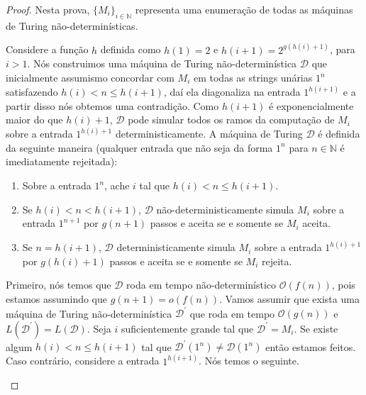 \begin{proof}

Nesta prova, $\{M_{i}\}_{i \in \mathbb{N}}$ representa uma enumeração de todas as máquinas de Turing não-determinísticas.

Considere a função $h$ definida como $h(1) = 2$ e $h(i + 1) = 2^{g(h(i) + 1)}$, para $i > 1$. Nós construimos uma máquina de Turing não-determinística $\mathcal{D}$ que inicialmente assumismo concordar com $M_{i}$ em todas as strings unárias $1^{n}$ satisfazendo $h(i) < n \leq h(i + 1)$, daí ela diagonaliza na entrada $1^{h(i + 1)}$ e a partir disso nós obtemos uma contradição. Como $h(i + 1)$ é exponencialmente maior do que $h(i) + 1$, $\mathcal{D}$ pode simular todos os ramos da computação de $M_{i}$ sobre a entrada $1^{h(i) + 1}$ deterministicamente. A máquina de Turing $\mathcal{D}$ é definida da seguinte maneira (qualquer entrada que não seja da forma $1^{n}$ para $n \in \mathbb{N}$ é imediatamente rejeitada):

\begin{enumerate}

\item Sobre a entrada $1^{n}$, ache $i$ tal que $h(i) < n \leq h(i + 1)$.

\item Se $h(i) < n < h(i + 1)$, $\mathcal{D}$ não-deterministicamente simula $M_{i}$ sobre a entrada $1^{n + 1}$ por $g(n + 1)$ passos e aceita se e somente se $M_{i}$ aceita.

\item Se $n = h(i + 1)$, $\mathcal{D}$ deterministicamente simula $M_{i}$ sobre a entrada $1^{h(i) + 1}$ por $g(h(i) + 1)$ passos e aceita se e somente se $M_{i}$ rejeita.

\end{enumerate}

Primeiro, nós temos que $\mathcal{D}$ roda em tempo não-determinístico $\mathcal{O}(f(n))$, pois estamos assumindo que $g(n + 1) = o(f(n))$. Vamos assumir que exista uma máquina de Turing não-determinística $\mathcal{D}^{\prime}$ que roda em tempo $\mathcal{O}(g(n))$ e $L(\mathcal{D}^{\prime}) = L(\mathcal{D})$. Seja $i$ suficientemente grande tal que $\mathcal{D}^{\prime} = M_{i}$. Se existe algum $h(i) < n \leq h(i + 1)$ tal que $\mathcal{D}^{\prime}(1^{n}) \neq \mathcal{D}(1^{n})$  então estamos feitos. Caso contrário, considere a entrada $1^{h(i + 1)}$. Nós temos o seguinte.

\begin{itemize}


\end{itemize}
\end{proof}
